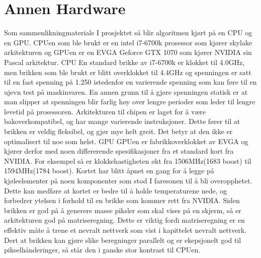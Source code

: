 \section{Annen Hardware}
Som sammenlikningmateriale I prosjektet så blir algoritmen kjørt på en CPU og en GPU. CPUen som ble brukt er en intel i7-6700k prosessor som kjører skylake arkitekturen og GPUen er en EVGA  Geforce GTX 1070 som kjører NVIDIA sin Pascal arkitektur.
CPU
En standard brikke av i7-6700k er klokket til 4.0GHz, men brikken som ble brukt er blitt overklokket til 4.4GHz og spenningen er satt til en fast spenning på 1.250 istedenfor en varierende spenning som kan føre til en ujevn test på maskinvaren. En annen grunn til å gjøre spenningen statisk er at man slipper at spenningen blir farlig høy over lengre perioder som leder til lengre levetid på prosessoren.
Arkitekturen til chipen er laget for å være bakoverkompatibel, og har mange varierende instruksjoner. Dette fører til at brikken er veldig fleksibel, og gjør mye helt greit. Det betyr at den ikke er optimalisert til noe som helst.
GPU
GPUen er fabrikkoverklokket av EVGA og kjører derfor med noen differerende spesifikasjoner fra et standard kort fra NVIDIA. For eksempel så er klokkehastigheten økt fra 1506MHz(1683 boost) til 1594MHz(1784 boost). Kortet har blitt åpnet en gang for å legge på kjøleelementer på noen komponenter som stod I faresonen til å bli overopphetet. Dette kan medføre at kortet er bedre til å holde temperaturene nede, og forbedrer ytelsen i forhold til en brikke som kommer rett fra NVIDIA.
Siden brikken er god på å generere masse piksler som skal vises på en skjerm, så er arkitekturen god på matriseregning. Dette er viktig fordi matriseregning er en effektiv måte å trene et nevralt nettverk som vist i kapittelet nevralt nettverk. Dert at brikken kan gjøre slike beregninger parallelt og er ekepsjonelt god til pikselhånderinger, så står den i ganske stor kontrast til CPUen.


\printbibliography
